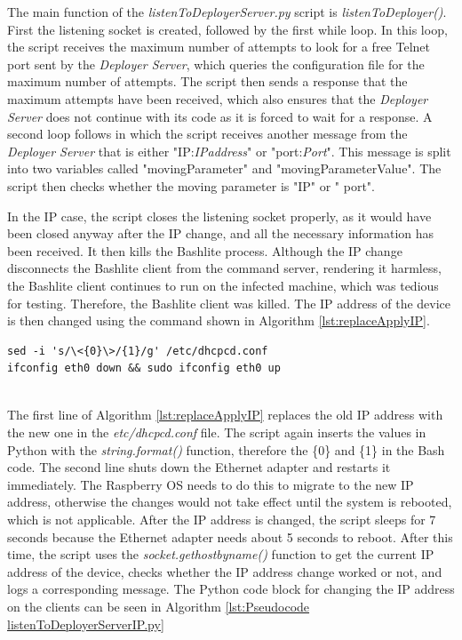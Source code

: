 The main function of the \textit{listenToDeployerServer.py} script is \textit{listenToDeployer()}. First the listening socket is created, followed by the first while loop. In this loop, the script receives the maximum number of attempts to look for a free Telnet port sent by the \textit{Deployer Server}, which queries the configuration file for the maximum number of attempts. The script then sends a response that the maximum attempts have been received, which also ensures that the \textit{Deployer Server} does not continue with its code as it is forced to wait for a response. A second loop follows in which the script receives another message from the \textit{Deployer Server} that is either "IP:\textit{IPaddress}" or "port:\textit{Port}". This message is split into two variables called "movingParameter" and "movingParameterValue". The script then checks whether the moving parameter is "IP" or " port".

In the IP case, the script closes the listening socket properly, as it would have been closed anyway after the IP change, and all the necessary information has been received. It then kills the Bashlite process. Although the IP change disconnects the Bashlite client from the command server, rendering it harmless, the Bashlite client continues to run on the infected machine, which was tedious for testing. Therefore, the Bashlite client was killed. The IP address of the device is then changed using the command shown in Algorithm \ref{lst:replaceApplyIP}.
\\

\begin{lstlisting}[caption={The Bash Commands to Change the IP Address.},label={lst:replaceApplyIP}]
sed -i 's/\<{0}\>/{1}/g' /etc/dhcpcd.conf
ifconfig eth0 down && sudo ifconfig eth0 up
                
\end{lstlisting}


The first line of Algorithm \ref{lst:replaceApplyIP} replaces the old IP address with the new one in the \textit{etc/dhcpcd.conf} file. The script again inserts the values in Python with the \textit{string.format()} function, therefore the \{0\} and \{1\} in the Bash code. The second line shuts down the Ethernet adapter and restarts it immediately. The Raspberry OS needs to do this to migrate to the new IP address, otherwise the changes would not take effect until the system is rebooted, which is not applicable. After the IP address is changed, the script sleeps for 7 seconds because the Ethernet adapter needs about 5 seconds to reboot. After this time, the script uses the \textit{socket.gethostbyname()} function to get the current IP address of the device, checks whether the IP address change worked or not, and logs a corresponding message. The Python code block for changing the IP address on the clients can be seen in Algorithm \ref{lst:Pseudocode listenToDeployerServerIP.py}
\\

